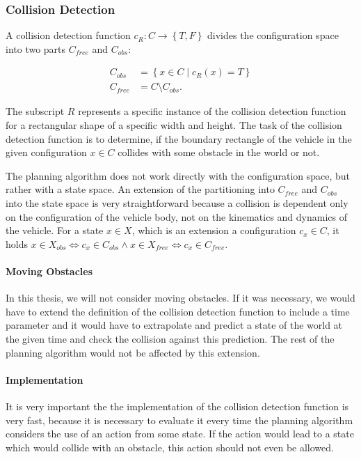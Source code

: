 \subsubsection{Collision Detection}

A collision detection function $c_{R}: C \rightarrow \left\{T, F\right\}$ divides the configuration space into two parts $C_{free}$ and $C_{obs}$:

\begin{equation*}
\begin{aligned}
	C_{obs} &= \left\{x\in C \mid c_{R}(x)=T\right\} \\
	C_{free} &= C \setminus C_{obs}.
\end{aligned}
\end{equation*}

The subscript $R$ represents a specific instance of the collision detection function for a rectangular shape of a specific width and height. The task of the collision detection function is to determine, if the boundary rectangle of the vehicle in the given configuration $x\in C$ collides with some obstacle in the world or not.

The planning algorithm does not work directly with the configuration space, but rather with a state space. An extension of the partitioning into $C_{free}$ and $C_{obs}$ into the state space is very straightforward because a collision is dependent only on the configuration of the vehicle body, not on the kinematics and dynamics of the vehicle. For a state $x\in X$, which is an extension a configuration $c_x \in C$, it holds $x\in X_{obs} \iff c_x\in C_{obs} \wedge x\in X_{free} \iff c_x\in C_{free}$.

\paragraph{Moving Obstacles}
In this thesis, we will not consider moving obstacles. If it was necessary, we would have to extend the definition of the collision detection function to include a time parameter and it would have to extrapolate and predict a state of the world at the given time and check the collision against this prediction. The rest of the planning algorithm would not be affected by this extension.

\paragraph{Implementation}
It is very important the the implementation of the collision detection function is very fast, because it is necessary to evaluate it every time the planning algorithm considers the use of an action from some state. If the action would lead to a state which would collide with an obstacle, this action should not even be allowed. 

